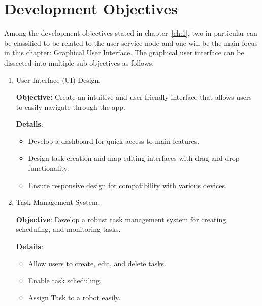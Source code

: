 \section{Development Objectives}
Among the development objectives stated in chapter~\ref{ch:1}, two in particular can be classified to be related to the user service node and one will be the main focus in this chapter: Graphical User Interface. The graphical user interface can be dissected into multiple sub-objectives as follows:
\begin{enumerate}
    \item User Interface (UI) Design.
    
            \vspace{-1.5mm}
            \textbf{Objective:} Create an intuitive and user-friendly interface that allows users to easily navigate through the app.
            
            \vspace{-1.5mm}
            \textbf{Details}:
            \begin{itemize}
                \vspace{-1mm}
                \item Develop a dashboard for quick access to main features.
                \vspace{-1mm}
                \item Design task creation and map editing interfaces with drag-and-drop functionality.
                \vspace{-1mm}
                \item Ensure responsive design for compatibility with various devices.
            \end{itemize}

            
    \item Task Management System.

        \vspace{-1.5mm}
        \textbf{Objective}: Develop a robust task management system for creating, scheduling, and monitoring tasks.

        \vspace{-1.5mm}
        \textbf{Details}:
        \begin{itemize}
            \vspace{-1mm}
            \item Allow users to create, edit, and delete tasks.
            \vspace{-1mm}
            \item Enable task scheduling.
            \vspace{-1mm}
            \item Assign Task to a robot easily.
        \end{itemize}


\end{enumerate}
